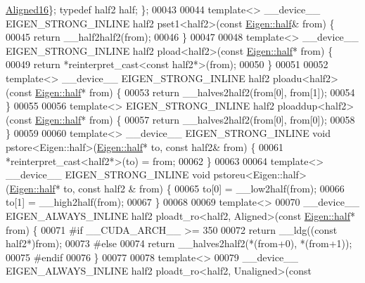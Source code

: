 \begin{DoxyCode}
      \hyperlink{group__enums_gga45fe06e29902b7a2773de05ba27b47a1af8e2bf74b04c02199f62c5e3c06dbfcc}{Aligned16}\}; \textcolor{keyword}{typedef} half2 half; \};
00043 
00044 \textcolor{keyword}{template}<> \_\_device\_\_ EIGEN\_STRONG\_INLINE half2 pset1<half2>(\textcolor{keyword}{const} \hyperlink{struct_eigen_1_1half}{Eigen::half}& from) \{
00045   \textcolor{keywordflow}{return} \_\_half2half2(from);
00046 \}
00047 
00048 \textcolor{keyword}{template}<> \_\_device\_\_ EIGEN\_STRONG\_INLINE half2 pload<half2>(\textcolor{keyword}{const} \hyperlink{struct_eigen_1_1half}{Eigen::half}* from) \{
00049   \textcolor{keywordflow}{return} *\textcolor{keyword}{reinterpret\_cast<}\textcolor{keyword}{const }half2*\textcolor{keyword}{>}(from);
00050 \}
00051 
00052 \textcolor{keyword}{template}<> \_\_device\_\_ EIGEN\_STRONG\_INLINE half2 ploadu<half2>(\textcolor{keyword}{const} \hyperlink{struct_eigen_1_1half}{Eigen::half}* from) \{
00053   \textcolor{keywordflow}{return} \_\_halves2half2(from[0], from[1]);
00054 \}
00055 
00056 \textcolor{keyword}{template}<> EIGEN\_STRONG\_INLINE half2 ploaddup<half2>(\textcolor{keyword}{const} \hyperlink{struct_eigen_1_1half}{Eigen::half}*  from) \{
00057   \textcolor{keywordflow}{return} \_\_halves2half2(from[0], from[0]);
00058 \}
00059 
00060 \textcolor{keyword}{template}<> \_\_device\_\_ EIGEN\_STRONG\_INLINE \textcolor{keywordtype}{void} pstore<Eigen::half>(\hyperlink{struct_eigen_1_1half}{Eigen::half}* to, \textcolor{keyword}{const} half2&
       from) \{
00061   *\textcolor{keyword}{reinterpret\_cast<}half2*\textcolor{keyword}{>}(to) = from;
00062 \}
00063 
00064 \textcolor{keyword}{template}<> \_\_device\_\_ EIGEN\_STRONG\_INLINE \textcolor{keywordtype}{void} pstoreu<Eigen::half>(\hyperlink{struct_eigen_1_1half}{Eigen::half}* to, \textcolor{keyword}{const} half2
      & from) \{
00065   to[0] = \_\_low2half(from);
00066   to[1] = \_\_high2half(from);
00067 \}
00068 
00069 \textcolor{keyword}{template}<>
00070  \_\_device\_\_ EIGEN\_ALWAYS\_INLINE half2 ploadt\_ro<half2, Aligned>(\textcolor{keyword}{const} 
      \hyperlink{struct_eigen_1_1half}{Eigen::half}* from) \{
00071 \textcolor{preprocessor}{#if \_\_CUDA\_ARCH\_\_ >= 350}
00072    \textcolor{keywordflow}{return} \_\_ldg((\textcolor{keyword}{const} half2*)from);
00073 \textcolor{preprocessor}{#else}
00074   \textcolor{keywordflow}{return} \_\_halves2half2(*(from+0), *(from+1));
00075 \textcolor{preprocessor}{#endif}
00076 \}
00077 
00078 \textcolor{keyword}{template}<>
00079 \_\_device\_\_ EIGEN\_ALWAYS\_INLINE half2 ploadt\_ro<half2, Unaligned>(\textcolor{keyword}{const} 

\end{DoxyCode}
